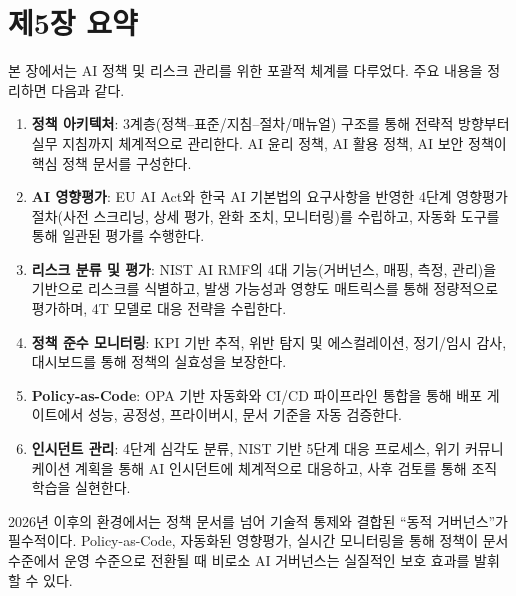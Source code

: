 \section*{제5장 요약}

본 장에서는 AI 정책 및 리스크 관리를 위한 포괄적 체계를 다루었다. 주요 내용을 정리하면 다음과 같다.

\begin{enumerate}
 \item \textbf{정책 아키텍처}: 3계층(정책--표준/지침--절차/매뉴얼) 구조를 통해 전략적 방향부터 실무 지침까지 체계적으로 관리한다. AI 윤리 정책, AI 활용 정책, AI 보안 정책이 핵심 정책 문서를 구성한다.

 \item \textbf{AI 영향평가}: EU AI Act와 한국 AI 기본법의 요구사항을 반영한 4단계 영향평가 절차(사전 스크리닝, 상세 평가, 완화 조치, 모니터링)를 수립하고, 자동화 도구를 통해 일관된 평가를 수행한다.

 \item \textbf{리스크 분류 및 평가}: NIST AI RMF의 4대 기능(거버넌스, 매핑, 측정, 관리)을 기반으로 리스크를 식별하고, 발생 가능성과 영향도 매트릭스를 통해 정량적으로 평가하며, 4T 모델로 대응 전략을 수립한다.

 \item \textbf{정책 준수 모니터링}: KPI 기반 추적, 위반 탐지 및 에스컬레이션, 정기/임시 감사, 대시보드를 통해 정책의 실효성을 보장한다.

 \item \textbf{Policy-as-Code}: OPA 기반 자동화와 CI/CD 파이프라인 통합을 통해 배포 게이트에서 성능, 공정성, 프라이버시, 문서 기준을 자동 검증한다.

 \item \textbf{인시던트 관리}: 4단계 심각도 분류, NIST 기반 5단계 대응 프로세스, 위기 커뮤니케이션 계획을 통해 AI 인시던트에 체계적으로 대응하고, 사후 검토를 통해 조직 학습을 실현한다.
\end{enumerate}

2026년 이후의 환경에서는 정책 문서를 넘어 기술적 통제와 결합된 ``동적 거버넌스''가 필수적이다. Policy-as-Code, 자동화된 영향평가, 실시간 모니터링을 통해 정책이 문서 수준에서 운영 수준으로 전환될 때 비로소 AI 거버넌스는 실질적인 보호 효과를 발휘할 수 있다.
